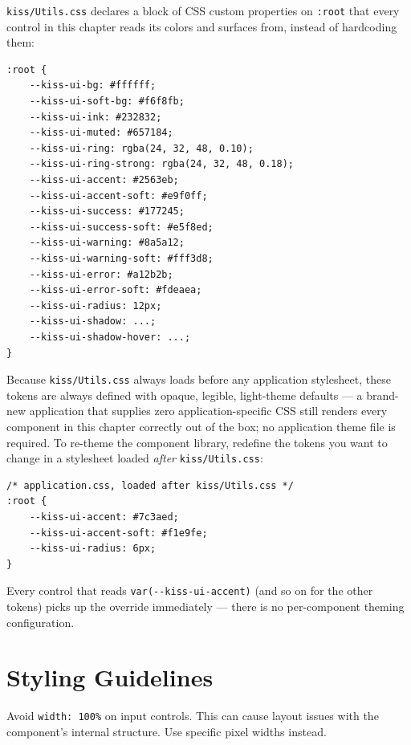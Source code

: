 \texttt{kiss/Utils.css} declares a block of CSS custom properties on \texttt{:root} that every control in this chapter reads its colors and surfaces from, instead of hardcoding them:

\begin{lstlisting}[language={}]
:root {
    --kiss-ui-bg: #ffffff;
    --kiss-ui-soft-bg: #f6f8fb;
    --kiss-ui-ink: #232832;
    --kiss-ui-muted: #657184;
    --kiss-ui-ring: rgba(24, 32, 48, 0.10);
    --kiss-ui-ring-strong: rgba(24, 32, 48, 0.18);
    --kiss-ui-accent: #2563eb;
    --kiss-ui-accent-soft: #e9f0ff;
    --kiss-ui-success: #177245;
    --kiss-ui-success-soft: #e5f8ed;
    --kiss-ui-warning: #8a5a12;
    --kiss-ui-warning-soft: #fff3d8;
    --kiss-ui-error: #a12b2b;
    --kiss-ui-error-soft: #fdeaea;
    --kiss-ui-radius: 12px;
    --kiss-ui-shadow: ...;
    --kiss-ui-shadow-hover: ...;
}
\end{lstlisting}

\noindent
Because \texttt{kiss/Utils.css} always loads before any application stylesheet, these tokens are always defined with opaque, legible, light-theme defaults --- a brand-new application that supplies zero application-specific CSS still renders every component in this chapter correctly out of the box; no application theme file is required.  To re-theme the component library, redefine the tokens you want to change in a stylesheet loaded \emph{after} \texttt{kiss/Utils.css}:

\begin{lstlisting}[language={}]
/* application.css, loaded after kiss/Utils.css */
:root {
    --kiss-ui-accent: #7c3aed;
    --kiss-ui-accent-soft: #f1e9fe;
    --kiss-ui-radius: 6px;
}
\end{lstlisting}

\noindent
Every control that reads \texttt{var(-{}-kiss-ui-accent)} (and so on for the other tokens) picks up the override immediately --- there is no per-component theming configuration.

\section{Styling Guidelines}
\label{sec:comp-styling}

\begin{tipbox}
Avoid \texttt{width: 100\%} on input controls.  This can cause layout issues with the component's internal structure.  Use specific pixel widths instead.
\end{tipbox}


